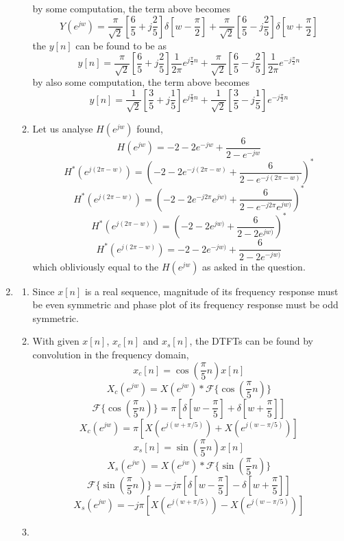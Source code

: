 \documentclass[a4paper,12pt]{article}
\begin{document}
\begin{enumerate}
\begin{enumerate}
				by some computation, the term above becomes
				$$	\boxed {Y(e^{jw})=\frac{\pi}{\sqrt{2}}\left[\frac{6}{5}+j\frac{2}{5}\right]\delta [w-\frac{\pi}{2}] + \frac{\pi}{\sqrt{2}}\left[\frac{6}{5}-j\frac{2}{5}\right]\delta [w+\frac{\pi}{2}]} $$
				the $y[n]$ can be found to be as
				$$	y[n]=\frac{\pi}{\sqrt{2}}\left[\frac{6}{5}+j\frac{2}{5}\right]\frac{1}{2\pi}e^{j\frac{\pi}{2}n} + \frac{\pi}{\sqrt{2}}\left[\frac{6}{5}-j\frac{2}{5}\right]\frac{1}{2\pi}e^{-j\frac{\pi}{2}n}	$$
				by also some computation, the term above becomes
				$$\boxed{	y[n]=	\frac{1}{\sqrt{2}}\left[\frac{3}{5}+j\frac{1}{5}\right]e^{j\frac{\pi}{2}n} + \frac{1}{\sqrt{2}}\left[\frac{3}{5}-j\frac{1}{5}\right]e^{-j\frac{\pi}{2}n} }$$		
			\item 	Let us analyse $H(e^{jw})$ found,		
			$$ H(e^{jw})=-2-2e^{-jw}+\frac{6}{2-e^{-jw}} $$	
			$$ H^*(e^{j(2\pi-w)})={\left(-2-2e^{-j(2\pi-w)}+\frac{6}{2-e^{-j(2\pi-w)}}\right)}^* $$
			$$ H^*(e^{j(2\pi-w)})={\left(-2-2e^{-j2\pi}e^{jw)}+\frac{6}{2-e^{-j2\pi}e^{jw)}}\right)}^* $$	
			$$ H^*(e^{j(2\pi-w)})={\left(-2-2e^{jw)}+\frac{6}{2-2e^{jw)}}\right)}^* $$	
			$$\boxed { H^*(e^{j(2\pi-w)})=-2-2e^{-jw)}+\frac{6}{2-2e^{-jw)}}} $$	
			which obliviously equal to the $H(e^{jw})$ as asked in the question.
			
		\end{enumerate}
	
	\item 
		
		\begin{enumerate}
			\item Since $x[n]$ is a real sequence, magnitude of its frequency response must be even symmetric and phase plot of its frequency response must be odd symmetric. 
			\item With given $x[n]$, $x_c[n]$ and $x_s[n]$, the DTFTs can be found by convolution in the frequency domain,
				$$	x_c[n]=\cos(\frac{\pi}{5}n) x[n]$$
				$$	X_c(e^{jw})=X(e^{jw})*\mathcal{F}\{\cos(\frac{\pi}{5}n)\} $$
				$$ \mathcal{F}\{\cos(\frac{\pi}{5}n)\}=\pi\left[\delta [w-\frac{\pi}{5}]+\delta [w+\frac{\pi}{5}]\right] $$
				$$\boxed{	X_c(e^{jw})= \pi\left[X(e^{j(w+\pi/5)})+X(e^{j(w-\pi/5)})\right] }$$
				$$	x_s[n]=\sin(\frac{\pi}{5}n) x[n]$$
				$$	X_s(e^{jw})=X(e^{jw})*\mathcal{F}\{\sin(\frac{\pi}{5}n)\} $$
				$$ \mathcal{F}\{\sin(\frac{\pi}{5}n)\}=-j\pi\left[\delta [w-\frac{\pi}{5}]-\delta [w+\frac{\pi}{5}]\right] $$
				$$\boxed{	X_s(e^{jw})= -j\pi\left[X(e^{j(w+\pi/5)})-X(e^{j(w-\pi/5)})\right] }$$
			\item
		\end{enumerate}
	

\end{enumerate}
\end{document}
